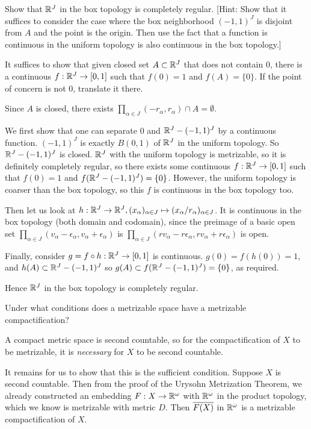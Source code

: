 \documentclass[a4paper, 10pt]{article}
\begin{document}
\begin{problem} [33.9 \done]
    Show that $\mathbb{R}^J$ in the box topology is completely regular. [Hint: Show that it suffices to consider the case where the box neighborhood $(-1, 1)^J$ is disjoint from $A$ and the point is the origin. Then use the fact that a function is continuous in the uniform topology is also continuous in the box topology.]
\end{problem}
\begin{solution}
    It suffices to show that given closed set $A \subset \mathbb{R}^J$ that does not contain $0$, there is a continuous $f: \mathbb{R}^J \to [0, 1]$ such that $f(0) = 1 $ and $f(A) = \{0\}$. If the point of concern is not 0, translate it there.

    Since $A$ is closed, there exists $\prod_{\alpha \in J}(-r_\alpha, r_\alpha) \cap A = \emptyset$.

    We first show that one can separate $0$ and $\mathbb{R}^J - (-1, 1)^J$ by a continuous function. $(-1, 1)^J$ is exactly $B(0, 1)$ of $\mathbb{R}^J$ in the uniform topology. So $\mathbb{R}^J  - (-1, 1)^J$ is closed. $\mathbb{R}^J$ with the uniform topology is metrizable, so it is definitely completely regular, so there exists some continuous $f: \mathbb{R}^J \to [0, 1]$ such that $f(0) = 1$ and $f(\mathbb{R}^J - (-1, 1)^J) = \{0\}$. However, the uniform topology is coarser than the box topology, so this $f$ is continuous in the box topology too.

    Then let us look at $h: \mathbb{R}^J \to \mathbb{R}^J, (x_\alpha)_{\alpha \in J} \mapsto (x_\alpha/r_\alpha)_{\alpha \in J}$. It is continuous in the box topology (both domain and codomain), since the preimage of a basic open set $\prod_{\alpha \in J}(v_\alpha - \epsilon_\alpha, v_\alpha + \epsilon_\alpha)$ is $\prod_{\alpha \in J}(rv_\alpha - r\epsilon_\alpha, rv_\alpha + r\epsilon_\alpha)$ is open.

    Finally, consider $g= f \circ h : \mathbb{R}^J \to [0, 1]$ is continuous. $g(0) =f(h(0)) = 1$, and $h(A) \subset \mathbb{R}^J - (-1, 1)^J$ so $g(A) \subset f(\mathbb{R}^J - (-1, 1)^J) = \{0\}$, as required.

    Hence $\mathbb{R}^J$ in the box topology is completely regular.
\end{solution}

\begin{problem} [38.3 \done ]
    Under what conditions does a metrizable space have a metrizable compactification?
\end{problem}
\begin{solution}
    A compact metric space is second countable, so for the compactification of $X$ to be metrizable, it is \textit{necessary} for $X$ to be second countable.

    It remains for us to show that this is the sufficient condition. Suppose $X$ is second countable. Then from the proof of the Urysohn Metrization Theorem, we already constructed an embedding $F: X \to \mathbb{R}^\omega$ with $\mathbb{R}^\omega$ in the product topology, which we know is metrizable with metric $D$. Then $\overline{F(X)}$ in $\mathbb{R}^\omega$ is a metrizable compactification of $X$.
\end{solution}
\end{document}
